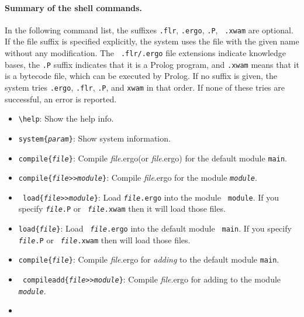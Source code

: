 \documentclass[11pt]{article}
\newcommand{\ERGO}{\mbox{\smaller{\ensuremath{\cal{E}}\smaller{{\sc{RGO}}}}}\xspace}
\newcommand{\FLSYSTEM}{\ERGO}
\newcommand{\flrext}{flr\xspace}
\newcommand{\ergoext}{ergo\xspace}
\newcommand{\bs}{\textbackslash}
\newcommand{\ofile}{xwam}
\begin{document}
\paragraph{Summary of the shell commands.}
In the following command list, the suffixes {\tt .\flrext}, \texttt{.\ergoext},
{\tt .P}, {\tt
  .\ofile} are optional. If the file suffix is specified explicitly, the
system uses the file with the given name without any modification. The {\tt
  .\flrext/.\ergoext} file extensions indicate \FLSYSTEM knowledge bases, the {\tt .P} suffix indicates that
it is a Prolog program, and {\tt .\ofile} means that it is a bytecode file,
which can be executed by Prolog.  If no suffix is given, the system tries
\texttt{.\ergoext}, \texttt{.\flrext}, \texttt{.P}, and
\texttt{\ofile} in that order.
If none of these tries are successful, an error is reported.
%
\begin{itemize}
\item {\tt \bs{}help}:
  Show the help info.
\item \texttt{system\{\textnormal\emph{param}\}}:
  Show system information.
\item {\tt compile\{\textnormal{\emph{file}}\}}:
  Compile \textnormal{\emph{file}}.\ergoext (or
  \textnormal{\emph{file}}.\ergoext) for the default module {\tt main}.
\item {\tt compile\{\textnormal{\emph{file}}>{}>\textnormal{\emph{module}}\}}:
  Compile \textnormal{\emph{file}}.\ergoext for the module {\tt \textnormal{\emph{module}}}.
\item {\tt
    load\{\textnormal{\emph{file}}>{}>\textnormal{\emph{module}}\}}: Load
  {\tt \textnormal{\emph{file}}.\ergoext} into the module {\tt
    module}. If you specify {\tt \textnormal{\emph{file}}.P} or {\tt
    \textnormal{\emph{file}}.\ofile} then it will load
  those files.
\item {\tt load\{\textnormal{\emph{file}}\}}: Load {\tt
    \textnormal{\emph{file}}.\ergoext} into the default module {\tt
    main}. If you specify {\tt \textnormal{\emph{file}}.P} or {\tt
    \textnormal{\emph{file}}.\ofile} then \FLSYSTEM will load
  those files.
\item {\tt compile\{\textnormal{\emph{file}}\}}:
  Compile \textnormal{\emph{file}}.\ergoext for \emph{adding} to the default module {\tt main}.
\item {\tt
    compileadd\{\textnormal{\emph{file}}>{}>\textnormal{\emph{module}}\}}:
  Compile \textnormal{\emph{file}}.\ergoext for adding to the module {\tt
    \textnormal{\emph{module}}}.
\item {\tt
}
\end{itemize}
\end{document}
